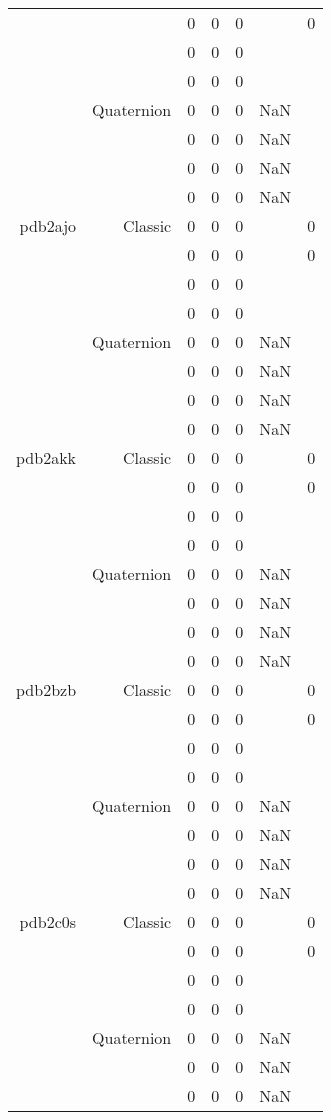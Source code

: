 \begin{xltabular}{\textwidth}{r|rcccSc}
& & 0 & 0 & 0 & & 0 \\
& & 0 & 0 & 0 & & \\
& & 0 & 0 & 0 & & \\
& Quaternion & 0 & 0 & 0 & NaN & \\
& & 0 & 0 & 0 & NaN & \\
& & 0 & 0 & 0 & NaN & \\
& & 0 & 0 & 0 & NaN & \\ \addlinespace
pdb2ajo & Classic & 0 & 0 & 0 & & 0 \\
& & 0 & 0 & 0 & & 0 \\
& & 0 & 0 & 0 & & \\
& & 0 & 0 & 0 & & \\
& Quaternion & 0 & 0 & 0 & NaN & \\
& & 0 & 0 & 0 & NaN & \\
& & 0 & 0 & 0 & NaN & \\
& & 0 & 0 & 0 & NaN & \\ \addlinespace
pdb2akk & Classic & 0 & 0 & 0 & & 0 \\
& & 0 & 0 & 0 & & 0 \\
& & 0 & 0 & 0 & & \\
& & 0 & 0 & 0 & & \\
& Quaternion & 0 & 0 & 0 & NaN & \\
& & 0 & 0 & 0 & NaN & \\
& & 0 & 0 & 0 & NaN & \\
& & 0 & 0 & 0 & NaN & \\ \addlinespace
pdb2bzb & Classic & 0 & 0 & 0 & & 0 \\
& & 0 & 0 & 0 & & 0 \\
& & 0 & 0 & 0 & & \\
& & 0 & 0 & 0 & & \\
& Quaternion & 0 & 0 & 0 & NaN & \\
& & 0 & 0 & 0 & NaN & \\
& & 0 & 0 & 0 & NaN & \\
& & 0 & 0 & 0 & NaN & \\ \addlinespace
pdb2c0s & Classic & 0 & 0 & 0 & & 0 \\
& & 0 & 0 & 0 & & 0 \\
& & 0 & 0 & 0 & & \\
& & 0 & 0 & 0 & & \\
& Quaternion & 0 & 0 & 0 & NaN & \\
& & 0 & 0 & 0 & NaN & \\
& & 0 & 0 & 0 & NaN & \\

\end{xltabular}
